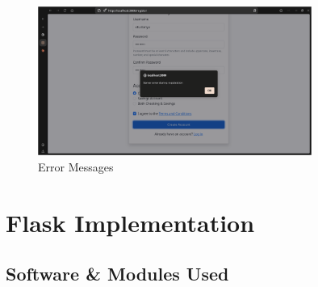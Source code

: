 \begin{figure}[h]
  \centering
  \includegraphics[width=0.8\textwidth]{express_assets/error.png}
  \caption{Error Messages}
\end{figure}

\chapter{Flask Implementation}
\section{Software \& Modules Used}


